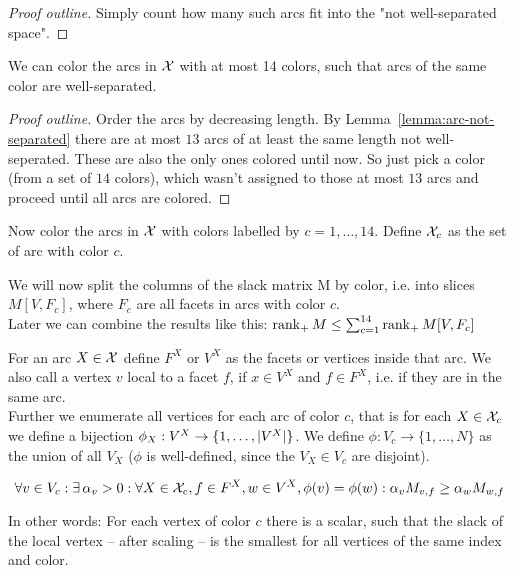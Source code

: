 \begin{proof}[Proof outline]
  Simply count how many such arcs fit into the "not well-separated space".
\end{proof}

\begin{lemma}
  We can color the arcs in $\mathcal{X}$ with at most 14 colors, such that arcs of the same color are well-separated.
\end{lemma}

\begin{proof}[Proof outline]
  Order the arcs by decreasing length. By Lemma~\ref{lemma:arc-not-separated} there are at most $13$ arcs of at least the same length not well-seperated. These are also the only ones colored until now. So just pick a color (from a set of $14$ colors), which wasn't assigned to those at most $13$ arcs and proceed until all arcs are colored.
\end{proof}

Now color the arcs in $\mathcal{X}$ with colors labelled by $c=1,\dots,14$. Define $\mathcal{X}_c$ as the set of arc with color $c$.

We will now split the columns of the slack matrix M by color, i.e. into slices $M[V,F_c]$, where $F_c$ are all facets in arcs with color $c$.\\
Later we can combine the results like this: $\operatorname{rank}_+M \leq \sum_{c=1}^{14} \operatorname{rank}_+ M[V,F_c]$

For an arc $X \in \mathcal{X}$ define $F^X$ or $V^X$ as the facets or vertices inside that arc. We also call a vertex $v$ local to a facet $f$, if $x \in V^X$ and $f \in F^X$, i.e. if they are in the same arc. \\
Further we enumerate all vertices for each arc of color $c$, that is for each $X \in \mathcal{X}_c$ we define a bijection $\phi_X: V^X \to \{1,\dots,\lvert V^X\rvert\}$. We define $\phi: V_c \to \{1,\dots,N\}$ as the union of all $V_X$ ($\phi$ is well-defined, since the $V_X \in V_c$ are disjoint).

\begin{lemma}
  $$\forall v \in V_c: \exists\,\alpha_v > 0: \forall X \in \mathcal{X}_c, f \in F^X, w \in V^X, \phi(v)=\phi(w): \alpha_v M_{v,f} \geq \alpha_w M_{w,f}$$
\end{lemma}

In other words: For each vertex of color $c$ there is a scalar, such that the slack of the local vertex -- after scaling -- is the smallest for all vertices of the same index and color.

